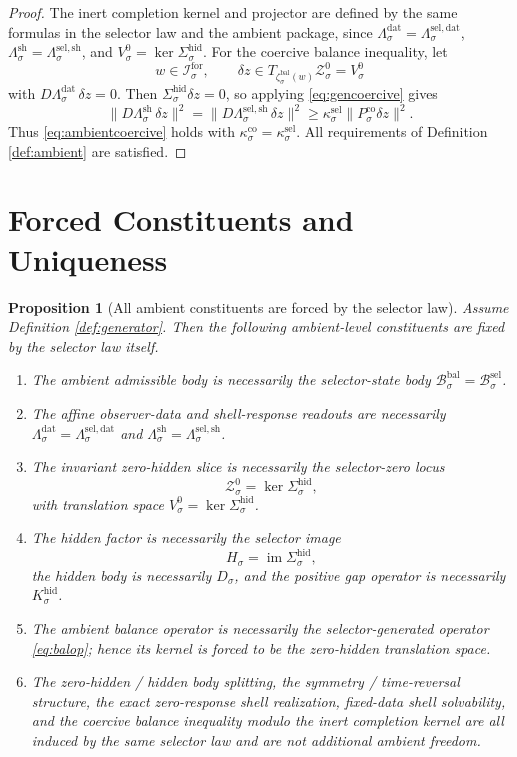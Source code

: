\documentclass[11pt]{article}
\newcommand{\ForSpace}[1]{\mathcal I_{#1}^{\mathrm{for}}}
\newcommand{\BalBody}[1]{\mathcal B_{#1}^{\mathrm{bal}}}
\newcommand{\BalData}[1]{\Lambda_{#1}^{\mathrm{dat}}}
\newcommand{\BalShell}[1]{\Lambda_{#1}^{\mathrm{sh}}}
\newcommand{\ZeroHiddenSlice}[1]{\mathcal Z_{#1}^{0}}
\newcommand{\ZeroHiddenVec}[1]{V_{#1}^{0}}
\newcommand{\BalEmbed}[1]{\zeta_{#1}^{\mathrm{bal}}}
\newcommand{\StateComp}[1]{P_{#1}^{\mathrm{co}}}
\newcommand{\GapSpace}[1]{H_{#1}}
\newcommand{\GapBody}[1]{D_{#1}}
\newcommand{\HiddenOperator}[1]{K_{#1}^{\mathrm{hid}}}
\newcommand{\GenBody}[1]{\mathcal B_{#1}^{\mathrm{sel}}}
\newcommand{\GenData}[1]{\Lambda_{#1}^{\mathrm{sel,dat}}}
\newcommand{\GenShell}[1]{\Lambda_{#1}^{\mathrm{sel,sh}}}
\newcommand{\HiddenSel}[1]{\Sigma_{#1}^{\mathrm{hid}}}
\newtheorem{proposition}{Proposition}
\begin{document}
\begin{proof}
The inert completion kernel and projector are defined by the same formulas in the selector law and the ambient package, since \(\BalData{\sigma}=\GenData{\sigma}\), \(\BalShell{\sigma}=\GenShell{\sigma}\), and \(\ZeroHiddenVec{\sigma}=\ker\HiddenSel{\sigma}\). For the coercive balance inequality, let
\[
w\in\ForSpace{\sigma},
\qquad
\delta z\in T_{\BalEmbed{\sigma}(w)}\ZeroHiddenSlice{\sigma}=\ZeroHiddenVec{\sigma}
\]
with \(D\BalData{\sigma}\,\delta z=0\). Then \(\HiddenSel{\sigma}\delta z=0\), so applying \eqref{eq:gencoercive} gives
\[
\|D\BalShell{\sigma}\,\delta z\|^{2}
=
\|D\GenShell{\sigma}\,\delta z\|^{2}
\ge
\kappa_{\sigma}^{\mathrm{sel}}
\|\StateComp{\sigma}\delta z\|^{2}.
\]
Thus \eqref{eq:ambientcoercive} holds with \(\kappa_{\sigma}^{\mathrm{co}}=\kappa_{\sigma}^{\mathrm{sel}}\). All requirements of Definition \ref{def:ambient} are satisfied.
\end{proof}

\section{Forced Constituents and Uniqueness}

\begin{proposition}[All ambient constituents are forced by the selector law]
\label{prop:forced}
Assume Definition \ref{def:generator}. Then the following ambient-level constituents are fixed by the selector law itself.
\begin{enumerate}
    \item The ambient admissible body is necessarily the selector-state body \(\BalBody{\sigma}=\GenBody{\sigma}\).
    \item The affine observer-data and shell-response readouts are necessarily \(\BalData{\sigma}=\GenData{\sigma}\) and \(\BalShell{\sigma}=\GenShell{\sigma}\).
    \item The invariant zero-hidden slice is necessarily the selector-zero locus
    \[
    \ZeroHiddenSlice{\sigma}=\ker\HiddenSel{\sigma},
    \]
    with translation space \(\ZeroHiddenVec{\sigma}=\ker\HiddenSel{\sigma}\).
    \item The hidden factor is necessarily the selector image
    \[
    \GapSpace{\sigma}=\operatorname{im}\HiddenSel{\sigma},
    \]
    the hidden body is necessarily \(\GapBody{\sigma}\), and the positive gap operator is necessarily \(\HiddenOperator{\sigma}\).
    \item The ambient balance operator is necessarily the selector-generated operator \eqref{eq:balop}; hence its kernel is forced to be the zero-hidden translation space.
    \item The zero-hidden / hidden body splitting, the symmetry / time-reversal structure, the exact zero-response shell realization, fixed-data shell solvability, and the coercive balance inequality modulo the inert completion kernel are all induced by the same selector law and are not additional ambient freedom.
\end{enumerate}
\end{proposition}
\end{document}
